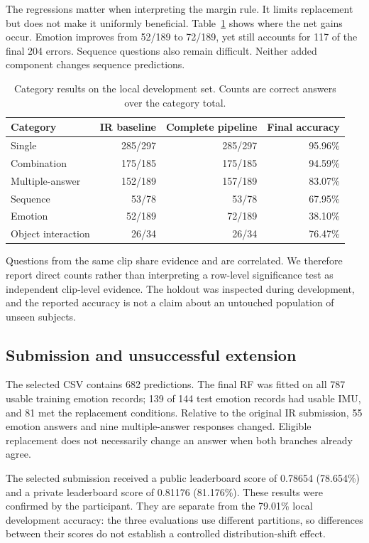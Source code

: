 \documentclass[12pt,a4paper]{article}
\begin{document}
The regressions matter when interpreting the margin rule. It limits replacement but does not make it uniformly beneficial. Table~\ref{tab:category} shows where the net gains occur. Emotion improves from 52/189 to 72/189, yet still accounts for 117 of the final 204 errors. Sequence questions also remain difficult. Neither added component changes sequence predictions.

\begin{table}[htbp]
\centering
\caption{Category results on the local development set. Counts are correct answers over the category total.}
\label{tab:category}
\begin{tabular}{@{}lrrr@{}}
\toprule Category & IR baseline & Complete pipeline & Final accuracy \\
\midrule
Single & 285/297 & 285/297 & 95.96\% \\
Combination & 175/185 & 175/185 & 94.59\% \\
Multiple-answer & 152/189 & 157/189 & 83.07\% \\
Sequence & 53/78 & 53/78 & 67.95\% \\
Emotion & 52/189 & 72/189 & 38.10\% \\
Object interaction & 26/34 & 26/34 & 76.47\% \\
\bottomrule
\end{tabular}
\end{table}
Questions from the same clip share evidence and are correlated. We therefore report direct counts rather than interpreting a row-level significance test as independent clip-level evidence. The holdout was inspected during development, and the reported accuracy is not a claim about an untouched population of unseen subjects.

\subsection{Submission and unsuccessful extension}
The selected CSV contains 682 predictions. The final RF was fitted on all 787 usable training emotion records; 139 of 144 test emotion records had usable IMU, and 81 met the replacement conditions. Relative to the original IR submission, 55 emotion answers and nine multiple-answer responses changed. Eligible replacement does not necessarily change an answer when both branches already agree.

The selected submission received a public leaderboard score of 0.78654 (78.654\%) and a private leaderboard score of 0.81176 (81.176\%). These results were confirmed by the participant. They are separate from the 79.01\% local development accuracy: the three evaluations use different partitions, so differences between their scores do not establish a controlled distribution-shift effect.
\end{document}
